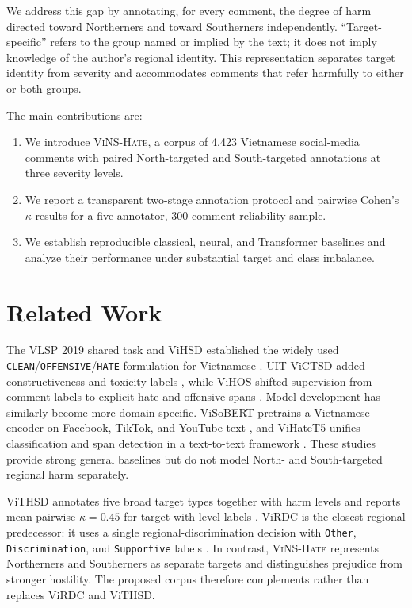 \documentclass[11pt]{article}
\newcommand{\dataset}{\textsc{ViNS-Hate}}
\begin{document}
We address this gap by annotating, for every comment, the degree of harm directed toward Northerners and toward Southerners independently. ``Target-specific'' refers to the group named or implied by the text; it does not imply knowledge of the author's regional identity. This representation separates target identity from severity and accommodates comments that refer harmfully to either or both groups.

The main contributions are:

\begin{enumerate}[leftmargin=1.5em]
  \item We introduce \dataset, a corpus of 4,423 Vietnamese social-media comments with paired North-targeted and South-targeted annotations at three severity levels.
  \item We report a transparent two-stage annotation protocol and pairwise Cohen's $\kappa$ results for a five-annotator, 300-comment reliability sample.
  \item We establish reproducible classical, neural, and Transformer baselines and analyze their performance under substantial target and class imbalance.
\end{enumerate}

\section{Related Work}

The VLSP 2019 shared task and ViHSD established the widely used \texttt{CLEAN}/\texttt{OFFENSIVE}/\texttt{HATE} formulation for Vietnamese \cite{vu2020vlsp,luu2021vihsd}. UIT-ViCTSD added constructiveness and toxicity labels \cite{nguyen2021victsd}, while ViHOS shifted supervision from comment labels to explicit hate and offensive spans \cite{hoang2023vihos}. Model development has similarly become more domain-specific. ViSoBERT pretrains a Vietnamese encoder on Facebook, TikTok, and YouTube text \cite{nguyen2023visobert}, and ViHateT5 unifies classification and span detection in a text-to-text framework \cite{nguyen2024vihatet5}. These studies provide strong general baselines but do not model North- and South-targeted regional harm separately.

ViTHSD annotates five broad target types together with harm levels and reports mean pairwise $\kappa=0.45$ for target-with-level labels \cite{vo2025vithsd}. ViRDC is the closest regional predecessor: it uses a single regional-discrimination decision with \texttt{Other}, \texttt{Discrimination}, and \texttt{Supportive} labels \cite{huynh2024virdc}. In contrast, \dataset{} represents Northerners and Southerners as separate targets and distinguishes prejudice from stronger hostility. The proposed corpus therefore complements rather than replaces ViRDC and ViTHSD.
\end{document}

